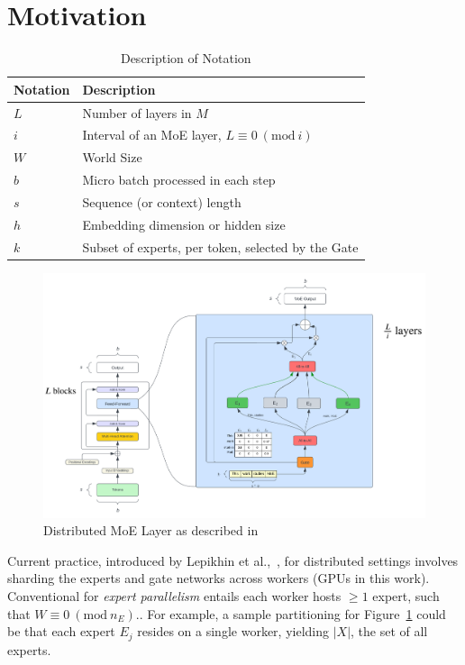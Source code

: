 
\section{Motivation}\label{sec:motivation}
\begin{table}[!h]
    \centering
    \begin{tabular}{ll}
        \toprule
        \textbf{Notation} & \textbf{Description} \\
        \midrule
        $L$ & Number of layers in $M$ \\
        $i$ & Interval of an MoE layer, $L\equiv 0\:(\mathrm{mod}\: i)$ \\
        $W$ & World Size \\
        $b$ & Micro batch processed in each step  \\
        $s$ & Sequence (or context) length \\
        $h$ & Embedding dimension or hidden size \\
        $k$ & Subset of experts, per token, selected by the Gate \\
        \bottomrule
    \end{tabular}
    \caption{Description of Notation}
    \label{tab:notation}
\end{table}
\begin{figure}[!h]
    \includegraphics[width=0.75\linewidth]{images/MoE}
    \caption{Distributed MoE Layer as described in~\cite{DBLP:journals/corr/abs-2006-16668}}
    \label{fig:moeLayer}
\end{figure}
Current practice, introduced by Lepikhin et al.,~\cite{DBLP:journals/corr/abs-2006-16668}, for distributed settings
involves sharding the experts and gate networks across workers (GPUs in this work).
Conventional for \emph{expert parallelism} entails each worker hosts $\geq 1$ expert,
such that $W \equiv 0 \: (\mathrm{mod \:}n_E).$.
For example, a sample partitioning for Figure~\ref{fig:moeLayer} could be that each expert $E_j$ resides on a single
worker, yielding $|X|$, the set of all experts.